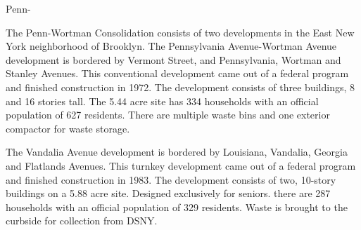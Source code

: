 Penn-

The Penn-Wortman Consolidation consists of two developments in the East New York neighborhood of Brooklyn. The Pennsylvania Avenue-Wortman Avenue development is bordered by Vermont Street, and Pennsylvania, Wortman and Stanley Avenues. This conventional development came out of a federal program and finished construction in 1972. The development consists of three buildings, 8 and 16 stories tall. The 5.44 acre site has 334 households with an official population of 627 residents. There are multiple waste bins and one exterior compactor for waste storage.

The Vandalia Avenue development is bordered by Louisiana, Vandalia, Georgia and Flatlands Avenues. This turnkey development came out of a federal program and finished construction in 1983. The development consists of two, 10-story buildings on a 5.88 acre site. Designed exclusively for seniors. there are 287 households with an official population of 329 residents. Waste is brought to the curbside for collection from DSNY.